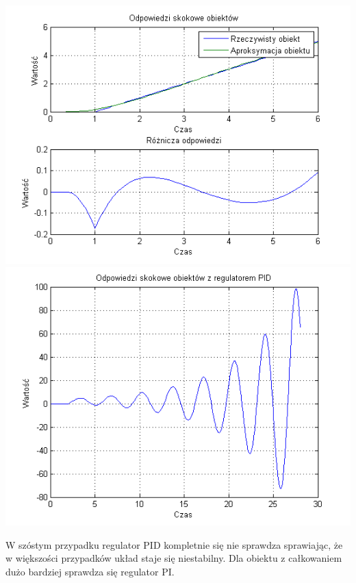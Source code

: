 \documentclass[10pt,a4paper]{article}
\begin{document}
\begin{center}
\includegraphics[scale=1]{images/dwa/skrypt_151.png}\\
\includegraphics[scale=1]{images/dwa/skrypt_152.png}\\
\end{center}
\newpage
W szóstym przypadku regulator PID kompletnie się nie sprawdza sprawiając, że w większości przypadków układ staje się niestabilny. Dla obiektu z całkowaniem dużo bardziej sprawdza się regulator PI.
\newpage
\end{document}
